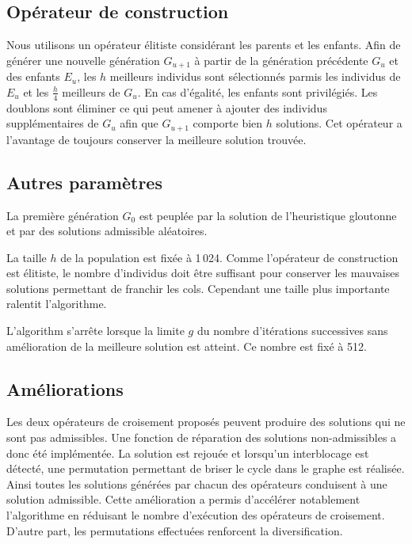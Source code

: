 \documentclass[french]{rapport}
\begin{document}
\subsection{Opérateur de construction}

Nous utilisons un opérateur élitiste considérant les parents et les enfants.  Afin de générer une
nouvelle génération $G_{u+1}$ à partir de la génération précédente $G_u$ et des enfants $E_u$, les
$h$ meilleurs individus sont sélectionnés parmis les individus de $E_u$ et les $\frac{h}{4}$
meilleurs de $G_u$. En cas d'égalité, les enfants sont privilégiés. Les doublons sont éliminer ce
qui peut amener à ajouter des individus supplémentaires de $G_u$ afin que $G_{u+1}$ comporte bien
$h$ solutions. Cet opérateur a l'avantage de toujours conserver la meilleure solution trouvée.

\subsection{Autres paramètres}

La première génération $G_0$ est peuplée par la solution de l'heuristique gloutonne et par des
solutions admissible aléatoires.

La taille $h$ de la population est fixée à 1\,024. Comme l'opérateur de construction est élitiste,
le nombre d'individus doit être suffisant pour conserver les mauvaises solutions permettant de
franchir les cols. Cependant une taille plus importante ralentit l'algorithme.

L'algorithm s'arrête lorsque la limite $g$ du nombre d'itérations successives sans amélioration de la
meilleure solution est atteint. Ce nombre est fixé à 512.


\subsection{Améliorations}

Les deux opérateurs de croisement proposés peuvent produire des solutions qui ne sont pas
admissibles. Une fonction de réparation des solutions non-admissibles a donc été implémentée. La
solution est rejouée et lorsqu'un interblocage est détecté, une permutation permettant de briser le
cycle dans le graphe est réalisée. Ainsi toutes les solutions générées par chacun des opérateurs
conduisent à une solution admissible. Cette amélioration a permis d'accélérer notablement
l'algorithme en réduisant le nombre d'exécution des opérateurs de croisement. D'autre part,
les permutations effectuées renforcent la diversification.
\end{document}

